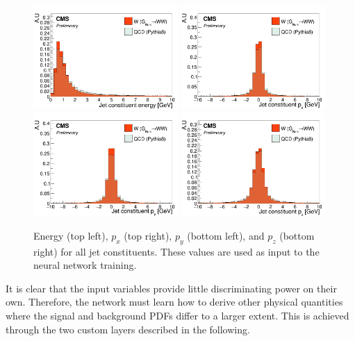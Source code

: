 \begin{figure}[h!]
\centering
\includegraphics[width=0.49\textwidth]{figures/vtagging/AN-18-099/input/inputs/sig-bkg/pe.png}
\includegraphics[width=0.49\textwidth]{figures/vtagging/AN-18-099/input/inputs/sig-bkg/ppx.png}\\
\includegraphics[width=0.49\textwidth]{figures/vtagging/AN-18-099/input/inputs/sig-bkg/ppy.png}
\includegraphics[width=0.49\textwidth]{figures/vtagging/AN-18-099/input/inputs/sig-bkg/ppz.png}
\caption{Energy (top left), $p_x$ (top right), $p_y$ (bottom left), and $p_z$ (bottom right) for all jet constituents. These values are used as input to the neural network training.}
\label{fig:lola:inputs}
\end{figure}
It is clear that the input variables provide little discriminating power on their own. Therefore, the network must learn how to derive other physical quantities where the signal and background PDFs differ to a larger extent. This is achieved through the two custom layers described in the following.

